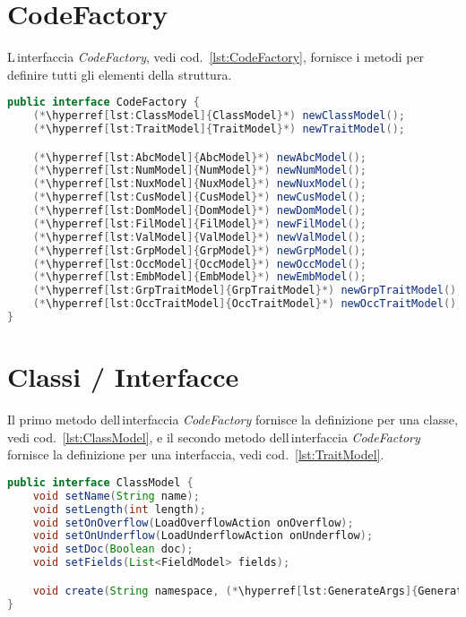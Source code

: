 \documentclass[a4paper,10pt]{report}
\begin{document}
\section{CodeFactory}
L\,interfaccia \textsl{CodeFactory}, vedi cod.~\ref{lst:CodeFactory}, fornisce i 
metodi per definire tutti gli elementi della struttura.

\begin{figure*}[!htb]
\begin{lstlisting}[language=java, caption=interfaccia CodeFactory, 
label=lst:CodeFactory]
public interface CodeFactory {
    (*\hyperref[lst:ClassModel]{ClassModel}*) newClassModel();
    (*\hyperref[lst:TraitModel]{TraitModel}*) newTraitModel();

    (*\hyperref[lst:AbcModel]{AbcModel}*) newAbcModel();
    (*\hyperref[lst:NumModel]{NumModel}*) newNumModel();
    (*\hyperref[lst:NuxModel]{NuxModel}*) newNuxModel();
    (*\hyperref[lst:CusModel]{CusModel}*) newCusModel();
    (*\hyperref[lst:DomModel]{DomModel}*) newDomModel();
    (*\hyperref[lst:FilModel]{FilModel}*) newFilModel();
    (*\hyperref[lst:ValModel]{ValModel}*) newValModel();
    (*\hyperref[lst:GrpModel]{GrpModel}*) newGrpModel();
    (*\hyperref[lst:OccModel]{OccModel}*) newOccModel();
    (*\hyperref[lst:EmbModel]{EmbModel}*) newEmbModel();
    (*\hyperref[lst:GrpTraitModel]{GrpTraitModel}*) newGrpTraitModel();
    (*\hyperref[lst:OccTraitModel]{OccTraitModel}*) newOccTraitModel();
}
\end{lstlisting}
\end{figure*}

\section{Classi / Interfacce}
Il primo metodo dell\,interfaccia \textsl{CodeFactory} fornisce la definizione 
per una classe, vedi cod.~\ref{lst:ClassModel}, e il secondo metodo 
dell\,interfaccia \textsl{CodeFactory} fornisce la definizione per una 
interfaccia, vedi cod.~\ref{lst:TraitModel}.


\begin{figure*}[!htb]
\begin{lstlisting}[language=java, caption=interfaccia ClassModel, 
label=lst:ClassModel]
public interface ClassModel {
    void setName(String name);
    void setLength(int length);
    void setOnOverflow(LoadOverflowAction onOverflow);
    void setOnUnderflow(LoadUnderflowAction onUnderflow);
    void setDoc(Boolean doc);
    void setFields(List<FieldModel> fields);

    void create(String namespace, (*\hyperref[lst:GenerateArgs]{GenerateArgs}*) ga, (*\hyperref[lst:FieldDefault]{FieldDefault}*) defaults);
}
\end{lstlisting}
\end{figure*}
\end{document}
